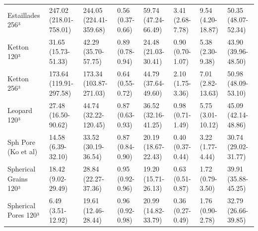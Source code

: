 \begin{tabular}{llllllll}
Estaillades 256³ & 247.02 (218.01-758.01) & 244.05 (224.41-359.68) & 0.56 (0.37-0.66) & 59.74 (47.24-66.49) & 3.41 (2.68-7.78) & 9.54 (4.20-18.87) & 50.35 (48.07-52.34) \\
Ketton 120³ & 31.65 (15.73-51.33) & 42.29 (35.70-57.75) & 0.89 (0.78-0.94) & 24.48 (21.03-30.41) & 0.90 (0.70-1.07) & 5.38 (2.30-9.38) & 43.90 (39.96-48.50) \\
Ketton 256³ & 173.64 (119.91-297.58) & 173.34 (103.87-271.03) & 0.64 (0.55-0.72) & 44.79 (37.64-49.60) & 2.10 (1.75-3.36) & 7.01 (2.82-13.63) & 50.98 (48.09-53.10) \\
Leopard 120³ & 27.48 (16.50-90.62) & 44.74 (32.22-120.45) & 0.87 (0.63-0.93) & 36.52 (32.16-41.25) & 0.98 (0.71-1.49) & 5.75 (3.01-10.12) & 45.09 (42.14-48.86) \\
Sph Pore (Ko et al) & 14.58 (6.39-32.10) & 33.52 (30.19-36.54) & 0.87 (0.84-0.90) & 20.19 (18.67-22.43) & 0.40 (0.37-0.44) & 3.22 (1.77-4.44) & 30.74 (29.02-31.77) \\
Spherical Grains 120³ & 18.42 (9.02-29.49) & 28.84 (22.27-37.36) & 0.95 (0.92-0.96) & 19.20 (15.71-26.13) & 0.63 (0.51-0.87) & 1.72 (0.79-3.50) & 39.91 (35.88-45.25) \\
Spherical Pores 120³ & 6.49 (3.51-12.92) & 19.61 (12.46-28.44) & 0.96 (0.92-0.98) & 20.99 (14.82-33.79) & 0.36 (0.27-0.49) & 1.76 (0.90-2.78) & 32.79 (26.66-39.85) \\
\bottomrule
\end{tabular}
